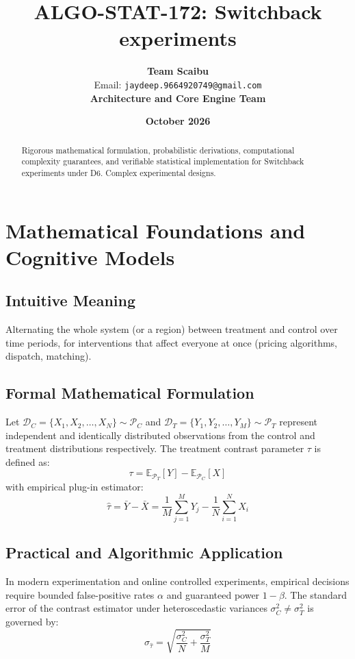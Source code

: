 \documentclass[11pt,a4paper]{article}
\title{\textbf{ALGO-STAT-172: Switchback experiments}}
\author{\textbf{Team Scaibu} \\ \small Email: \texttt{jaydeep.9664920749@gmail.com} \\ \small \textbf{Architecture and Core Engine Team}}
\date{\textbf{October 2026}}
\theoremstyle{definition}
\begin{document}
\maketitle

\begin{abstract}
Rigorous mathematical formulation, probabilistic derivations, computational complexity guarantees, and verifiable statistical implementation for Switchback experiments under D6. Complex experimental designs.
\end{abstract}

\section{Mathematical Foundations and Cognitive Models}

\subsection{Intuitive Meaning}
Alternating the whole system (or a region) between treatment and control over time periods, for interventions that affect everyone at once (pricing algorithms, dispatch, matching).

\subsection{Formal Mathematical Formulation}
Let $\mathcal{D}_C = \{X_1, X_2, \dots, X_N\} \sim \mathcal{P}_C$ and $\mathcal{D}_T = \{Y_1, Y_2, \dots, Y_M\} \sim \mathcal{P}_T$ represent independent and identically distributed observations from the control and treatment distributions respectively.
The treatment contrast parameter $\tau$ is defined as:
\begin{equation}
\tau = \mathbb{E}_{\mathcal{P}_T}[Y] - \mathbb{E}_{\mathcal{P}_C}[X]
\end{equation}
with empirical plug-in estimator:
\begin{equation}
\hat{\tau} = \bar{Y} - \bar{X} = \frac{1}{M} \sum_{j=1}^M Y_j - \frac{1}{N} \sum_{i=1}^N X_i
\end{equation}

\subsection{Practical and Algorithmic Application}
In modern experimentation and online controlled experiments, empirical decisions require bounded false-positive rates $\alpha$ and guaranteed power $1 - \beta$.
The standard error of the contrast estimator under heteroscedastic variances $\sigma_C^2 \neq \sigma_T^2$ is governed by:
\begin{equation}
\sigma_{\hat{\tau}} = \sqrt{\frac{\sigma_C^2}{N} + \frac{\sigma_T^2}{M}}
\end{equation}
\end{document}
